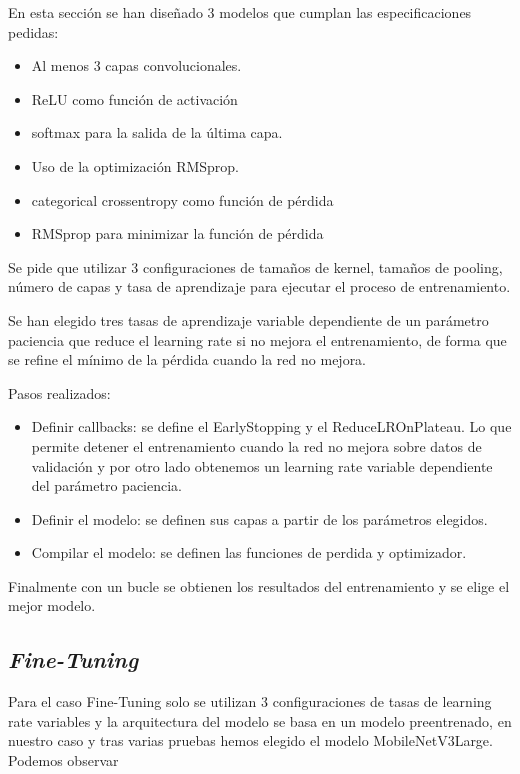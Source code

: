 En esta sección se han diseñado 3 modelos que cumplan las especificaciones pedidas:
\begin{itemize}
    \item Al menos 3 capas convolucionales.
    \item ReLU como función de activación
    \item softmax para la salida de la última capa.
    \item Uso de la optimización RMSprop.
    \item categorical crossentropy como función de pérdida
    \item RMSprop para minimizar la función de pérdida
\end{itemize}



Se pide que utilizar 3 configuraciones de tamaños de kernel, tamaños de pooling, número de capas y tasa de aprendizaje para ejecutar el proceso de entrenamiento.

Se han elegido tres tasas de aprendizaje variable dependiente de un parámetro paciencia que reduce el learning rate si no mejora el entrenamiento, de forma que se refine el mínimo de la pérdida cuando la red no mejora.

Pasos realizados:

\begin{itemize}
    \item Definir callbacks: se define el EarlyStopping y el ReduceLROnPlateau. Lo que permite detener el entrenamiento cuando la red no mejora sobre datos de validación y por otro lado obtenemos un learning rate variable dependiente del parámetro paciencia.
    \item Definir el modelo: se definen sus capas a partir de los parámetros elegidos.
    \item Compilar el modelo: se definen las funciones de perdida y optimizador.
\end{itemize}

Finalmente con un bucle se obtienen los resultados del entrenamiento y se elige el mejor modelo.

\subsection{\textit{Fine-Tuning}}
Para el caso Fine-Tuning solo se utilizan 3 configuraciones de tasas de learning rate variables
y la arquitectura del modelo se basa en un modelo preentrenado, en nuestro caso y tras varias pruebas hemos elegido el modelo MobileNetV3Large.
\noindent
Podemos observar 


